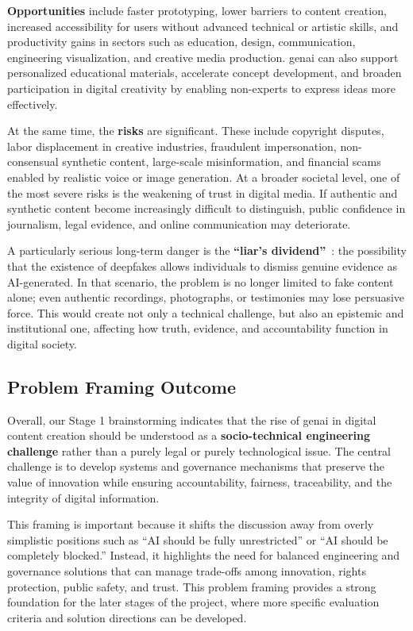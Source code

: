 \textbf{Opportunities} include faster prototyping, lower barriers to content creation, increased accessibility for users without advanced technical or artistic skills, and productivity gains in sectors such as education, design, communication, engineering visualization, and creative media production. \Ac{genai} can also support personalized educational materials, accelerate concept development, and broaden participation in digital creativity by enabling non-experts to express ideas more effectively.

At the same time, the \textbf{risks} are significant. These include copyright disputes, labor displacement in creative industries, fraudulent impersonation, non-consensual synthetic content, large-scale misinformation, and financial scams enabled by realistic voice or image generation. At a broader societal level, one of the most severe risks is the weakening of trust in digital media. If authentic and synthetic content become increasingly difficult to distinguish, public confidence in journalism, legal evidence, and online communication may deteriorate.

A particularly serious long-term danger is the \textbf{``liar's dividend''}~\cite{deepfakes-chesney}: the possibility that the existence of deepfakes allows individuals to dismiss genuine evidence as AI-generated. In that scenario, the problem is no longer limited to fake content alone; even authentic recordings, photographs, or testimonies may lose persuasive force. This would create not only a technical challenge, but also an epistemic and institutional one, affecting how truth, evidence, and accountability function in digital society.

\subsection{Problem Framing Outcome}\label{sec:framing-outcome}
Overall, our Stage 1 brainstorming indicates that the rise of \ac{genai} in digital content creation should be understood as a \textbf{socio-technical engineering challenge} rather than a purely legal or purely technological issue. The central challenge is to develop systems and governance mechanisms that preserve the value of innovation while ensuring accountability, fairness, traceability, and the integrity of digital information.

This framing is important because it shifts the discussion away from overly simplistic positions such as ``AI should be fully unrestricted'' or ``AI should be completely blocked.'' Instead, it highlights the need for balanced engineering and governance solutions that can manage trade-offs among innovation, rights protection, public safety, and trust. This problem framing provides a strong foundation for the later stages of the project, where more specific evaluation criteria and solution directions can be developed.
